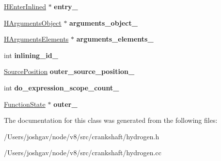 \begin{DoxyCompactItemize}
\item 
\hyperlink{classv8_1_1internal_1_1_h_enter_inlined}{H\+Enter\+Inlined} $\ast$ {\bfseries entry\+\_\+}\hypertarget{classv8_1_1internal_1_1_function_state_a0461ad5dbaaa437d7cf39e635102511e}{}\label{classv8_1_1internal_1_1_function_state_a0461ad5dbaaa437d7cf39e635102511e}

\item 
\hyperlink{classv8_1_1internal_1_1_h_arguments_object}{H\+Arguments\+Object} $\ast$ {\bfseries arguments\+\_\+object\+\_\+}\hypertarget{classv8_1_1internal_1_1_function_state_aa9f70db3fcb213ad93c86ecad05c49f9}{}\label{classv8_1_1internal_1_1_function_state_aa9f70db3fcb213ad93c86ecad05c49f9}

\item 
\hyperlink{classv8_1_1internal_1_1_h_arguments_elements}{H\+Arguments\+Elements} $\ast$ {\bfseries arguments\+\_\+elements\+\_\+}\hypertarget{classv8_1_1internal_1_1_function_state_ae0c2018e2a72db45b6315a84e3e4b499}{}\label{classv8_1_1internal_1_1_function_state_ae0c2018e2a72db45b6315a84e3e4b499}

\item 
int {\bfseries inlining\+\_\+id\+\_\+}\hypertarget{classv8_1_1internal_1_1_function_state_a2c541ce77dedb434b4bd9016660b805b}{}\label{classv8_1_1internal_1_1_function_state_a2c541ce77dedb434b4bd9016660b805b}

\item 
\hyperlink{classv8_1_1internal_1_1_source_position}{Source\+Position} {\bfseries outer\+\_\+source\+\_\+position\+\_\+}\hypertarget{classv8_1_1internal_1_1_function_state_a7d92689f4e089afd81052c8796d43ae9}{}\label{classv8_1_1internal_1_1_function_state_a7d92689f4e089afd81052c8796d43ae9}

\item 
int {\bfseries do\+\_\+expression\+\_\+scope\+\_\+count\+\_\+}\hypertarget{classv8_1_1internal_1_1_function_state_a9253f5cdac9271552d122598bab4accf}{}\label{classv8_1_1internal_1_1_function_state_a9253f5cdac9271552d122598bab4accf}

\item 
\hyperlink{classv8_1_1internal_1_1_function_state}{Function\+State} $\ast$ {\bfseries outer\+\_\+}\hypertarget{classv8_1_1internal_1_1_function_state_ada2830daa246b267f7d35f116bb95873}{}\label{classv8_1_1internal_1_1_function_state_ada2830daa246b267f7d35f116bb95873}

\end{DoxyCompactItemize}


The documentation for this class was generated from the following files\+:\begin{DoxyCompactItemize}
\item 
/\+Users/joshgav/node/v8/src/crankshaft/hydrogen.\+h\item 
/\+Users/joshgav/node/v8/src/crankshaft/hydrogen.\+cc\end{DoxyCompactItemize}
